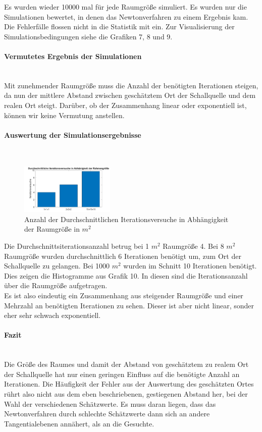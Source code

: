 Es wurden wieder 10000 mal für jede Raumgröße simuliert.
Es wurden nur die Simulationen bewertet, in denen das Newtonverfahren zu einem Ergebnis kam. Die Fehlerfälle flossen nicht in die Statistik mit ein.  Zur Visualisierung der Simulationsbedingungen siehe die Grafiken 7, 8 und 9.\\

\paragraph{Vermutetes Ergebnis der Simulationen}\ \\
Mit zunehmender Raumgröße muss die Anzahl der benötigten Iterationen steigen, da nun der mittlere Abstand zwischen geschätztem Ort der Schallquelle und dem realen Ort steigt.
Darüber, ob der Zusammenhang linear oder exponentiell ist, können wir keine Vermutung anstellen.
\paragraph{Auswertung der Simulationsergebnisse}\ \\
\begin{figure}
\centering 
\includegraphics[width=0.4\textwidth]{DurchschnittlicheIterationsversuche}
\caption{Anzahl der Durchschnittlichen Iterationsversuche in Abhängigkeit der Raumgröße in $m^{2}$}\label{fig:Anzahl der Durchschnittlichen Iterationsversuche in Abhängigkeit der Raumgröße in m}
\end{figure}
Die Durchschnittsiterationsanzahl betrug bei 1 $m^{2}$ Raumgröße 4. Bei 8 $m^{2}$ Raumgröße wurden durchschnittlich 6 Iterationen  benötigt um, zum Ort der Schallquelle zu gelangen. Bei 1000 $m^{2}$ wurden im Schnitt 10 Iterationen benötigt. Dies zeigen die Histogramme aus Grafik 10. In diesen sind die Iterationsanzahl über die Raumgröße aufgetragen. \\ Es ist also eindeutig ein Zusammenhang aus steigender Raumgröße und einer Mehrzahl an benötigten Iterationen zu sehen. Dieser ist aber nicht linear, sonder eher sehr schwach exponentiell.
\paragraph{Fazit}\ \\
Die Größe des Raumes und damit der Abstand von geschätztem zu realem Ort der Schallquelle hat nur einen geringen Einfluss auf die benötigte Anzahl an Iterationen. Die Häufigkeit der Fehler aus  der Auswertung des geschätzten Ortes  rührt also nicht aus dem eben beschriebenen, gestiegenen Abstand her, bei der Wahl der verschiedenen Schätzwerte. Es muss daran liegen, dass das Newtonverfahren durch schlechte Schätzwerte dann sich an andere Tangentialebenen annähert, als an die Gesuchte.
